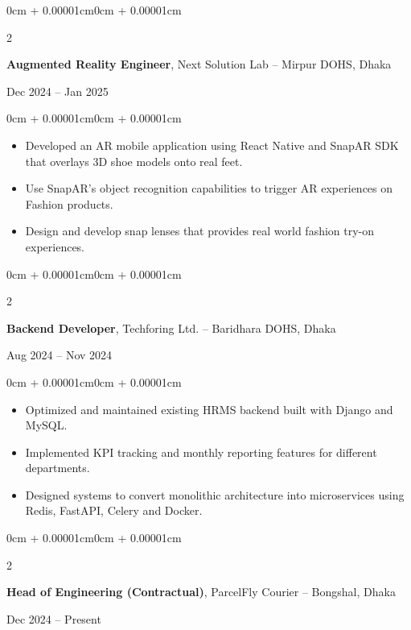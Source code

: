 \documentclass[10pt, letterpaper]{article}
\newenvironment{highlights}{
  \begin{itemize}[
    topsep=0.10cm,
    parsep=0.10cm,
    partopsep=0pt,
    itemsep=0pt,
    leftmargin=0cm + 10pt
  ]
}{
  \end{itemize}
}
\newenvironment{onecolentry}{\begin{adjustwidth}{0cm + 0.00001cm}{0cm + 0.00001cm}}{\end{adjustwidth}}
\newenvironment{twocolentry}[2][]{
  \onecolentry
  \def\secondColumn{#2}
  \setcolumnwidth{\fill, 4.5cm}
  \begin{paracol}{2}
}{
  \switchcolumn \raggedleft \secondColumn
  \end{paracol}
  \endonecolentry
}
\begin{document}
\begin{twocolentry}{Dec 2024 -- Jan 2025}
  \textbf{Augmented Reality Engineer}, Next Solution Lab -- Mirpur DOHS, Dhaka
\end{twocolentry}

\vspace{0.10cm}

\begin{onecolentry}
  \begin{highlights}
    \item Developed an AR mobile application using React Native and SnapAR SDK that overlays 3D shoe models onto real feet.
    \item Use SnapAR's object recognition capabilities to trigger AR experiences on Fashion products.
    \item Design and develop snap lenses that provides real world fashion try-on experiences.
  \end{highlights}
\end{onecolentry}

\vspace{0.20cm}

\begin{twocolentry}{Aug 2024 -- Nov 2024}
  \textbf{Backend Developer}, Techforing Ltd. -- Baridhara DOHS, Dhaka
\end{twocolentry}

\vspace{0.10cm}

\begin{onecolentry}
  \begin{highlights}
    \item Optimized and maintained existing HRMS backend built with Django and MySQL.
    \item Implemented KPI tracking and monthly reporting features for different departments.
    \item Designed systems to convert monolithic architecture into microservices using Redis, FastAPI, Celery and Docker.
  \end{highlights}
\end{onecolentry}

\vspace{0.20cm}

\begin{twocolentry}{Dec 2024 -- Present}
  \textbf{Head of Engineering (Contractual)}, ParcelFly Courier -- Bongshal, Dhaka
\end{twocolentry}

\vspace{0.10cm}
\end{document}
